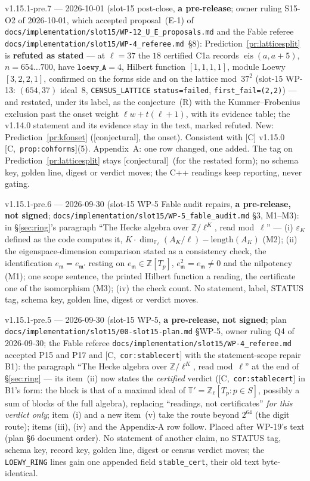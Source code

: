 \documentclass[11pt]{article}
\theoremstyle{remark}
\newcommand{\F}{\mathbb{F}}
\newcommand{\Z}{\mathbb{Z}}
\newcommand{\Fl}{\F_\ell}
\newcommand{\m}{\mathfrak{m}}
\newcommand{\HA}[1]{[C,~\texttt{#1}]}      %
\newcommand{\CONJ}{\textsf{[conjectural]}}
\begin{document}
v1.15.1-pre.7 --- 2026-10-01 (slot-15 post-close, \textbf{a pre-release}; owner ruling S15-O2 of 2026-10-01, which accepted
proposal~(E-1) of \texttt{docs/implementation/slot15/WP-12\_U\_E\_proposals.md} and the Fable referee
\texttt{docs/implementation/slot15/WP-4\_referee.md}~\S8): Prediction~\ref{pr:latticesplit} is \textbf{refuted as stated} --- at
$\ell=37$ the $18$ certified C1a records $\operatorname{eis}(a,a+5)$, $n=654\ldots700$, have $\texttt{loewy\_A}=4$, Hilbert function
$[1,1,1,1]$, module Loewy $[3,2,2,1]$, confirmed on the forms side and on the lattice mod~$37^2$ (slot-15 WP-13: $(654,37)$
ideal~$8$, \texttt{CENSUS\_LATTICE} \texttt{status=failed}, \texttt{first\_fail=(2,2)}) --- and restated, under its label, as the
conjecture~(R) with the Kummer--Frobenius exclusion past the onset weight $\ell w+t(\ell+1)$, with its evidence table; the v1.14.0
statement and its evidence stay in the text, marked refuted. New: Prediction~\ref{pr:kfonset} (\CONJ, the onset). Consistent with
[C] v1.15.0 \HA{prop:cohforms}(5). Appendix~A: one row changed, one added. The tag on Prediction~\ref{pr:latticesplit} stays \CONJ\
(for the restated form); no schema key, golden line, digest or verdict moves; the C++ readings keep reporting, never gating.

v1.15.1-pre.6 --- 2026-09-30 (slot-15 WP-5 Fable audit repairs, \textbf{a pre-release, not signed};
\texttt{docs/implementation/slot15/WP-5\_fable\_audit.md} \S3, M1--M3): in \S\ref{sec:ring}'s paragraph ``The Hecke algebra over $\Z/\ell^{K}$, read
mod~$\ell$'' --- (i) $\varepsilon_K$ defined as the code computes it, $K\cdot\dim_{\Fl}(A_K/\ell)-\mathrm{length}(A_K)$ (M2); (ii) the eigenspace-dimension
comparison stated as a consistency check, the identification $e_\m=e_{\m'}$ resting on $e_\m\in\Z[T_p]$, $e_\m^2=e_\m\ne0$ and the nilpotency (M1); one
scope sentence, the printed Hilbert function a reading, the certificate one of the isomorphism (M3); (iv) the check count. No statement, label,
STATUS tag, schema key, golden line, digest or verdict moves.

v1.15.1-pre.5 --- 2026-09-30 (slot-15 WP-5, \textbf{a pre-release, not signed}; plan \texttt{docs/implementation/slot15/00-slot15-plan.md}
\S WP-5, owner ruling Q4 of 2026-09-30; the Fable referee \texttt{docs/implementation/slot15/WP-4\_referee.md} accepted P15 and P17 and
\HA{cor:stablecert} with the statement-scope repair B1): the paragraph ``The Hecke algebra over $\Z/\ell^{K}$, read mod~$\ell$'' at the end of
\S\ref{sec:ring} --- its item~(ii) now states the \emph{certified} verdict (\HA{cor:stablecert} in B1's form: the block is that of a maximal
ideal of $\mathbb{T}'=\Z_\ell[T_p:p\in S]$, possibly a sum of blocks of the full algebra), replacing ``readings, not certificates'' \emph{for this verdict
only}; item~(i) and a new item~(v) take the route beyond $2^{64}$ (the digit route); items (iii), (iv) and the Appendix-A row follow. Placed after
WP-19's text (plan \S6 document order). No statement of another claim, no STATUS tag, schema key, record key, golden line, digest or census verdict
moves; the \texttt{LOEWY\_RING} lines gain one appended field \texttt{stable\_cert}, their old text byte-identical.
\end{document}

